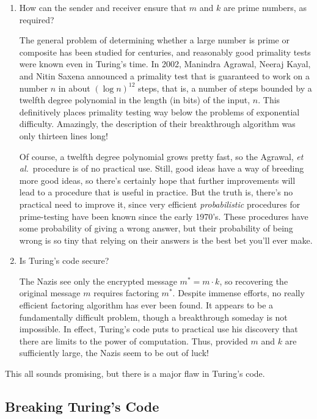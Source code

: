 \begin{enumerate}

\item How can the sender and receiver ensure that $m$ and $k$ are
prime numbers, as required?

The general problem of determining whether a large number is prime or
composite has been studied for centuries, and reasonably good primality
tests were known even in Turing's time.  In 2002, Manindra Agrawal, Neeraj
Kayal, and Nitin Saxena announced a primality test that is guaranteed to
work on a number $n$ in about $(\log n)^{12}$ steps, that is, a number of
steps bounded by a twelfth degree polynomial in the length (in bits) of
the input, $n$.  This definitively places primality testing way below the
problems of exponential difficulty.  Amazingly, the description of their
breakthrough algorithm was only thirteen lines long!

Of course, a twelfth degree polynomial grows pretty fast, so the
Agrawal, \emph{et al.}\ procedure is of no practical use.  Still, good
ideas have a way of breeding more good ideas, so there's certainly
hope that further improvements will lead to a procedure that is useful in
practice.  But the truth is, there's no practical need to improve it,
since very efficient \emph{probabilistic} procedures for prime-testing
have been known since the early 1970's.  These procedures have some
probability of giving a wrong answer, but their probability of being
wrong is so tiny that relying on their answers is the best bet you'll
ever make.

\item Is Turing's code secure?

The Nazis see only the encrypted message $m^* = m \cdot k$, so
recovering the original message $m$ requires factoring $m^*$.  Despite
immense efforts, no really efficient factoring algorithm has ever been
found.  It appears to be a fundamentally difficult problem, though a
breakthrough someday is not impossible.  In effect, Turing's code puts
to practical use his discovery that there are limits to the power of
computation.  Thus, provided $m$ and $k$ are sufficiently large, the
Nazis seem to be out of luck!

\end{enumerate}

This all sounds promising, but there is a major flaw in Turing's code.

\subsection{Breaking Turing's Code}

